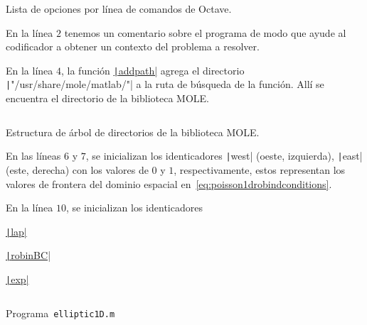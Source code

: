 \begin{problem}
\begin{listing}[ht!]
    \tiny
    \centering
    \inputminted{text}{octave-help.txt}
    \caption{Lista de opciones por línea de comandos de Octave.}
\end{listing}

En la línea $2$ tenemos un comentario sobre el programa de modo que
ayude al codificador a obtener un contexto del problema a resolver.



En la línea $4$, la función
\href{https://docs.octave.org/v9.3.0/Manipulating-the-Load-Path.html#index-addpath}{\texttt|addpath|}
agrega el directorio \texttt|"/usr/share/mole/matlab/"| a la ruta de búsqueda de la función.
Allí se encuentra el directorio de la biblioteca MOLE.

\begin{listing}[ht!]
    \tiny
    \centering
    \inputminted{text}{moledirectories.txt}
    \caption{Estructura de árbol de directorios de la biblioteca MOLE.}
\end{listing}

En las líneas $6$ y $7$, se inicializan los identicadores
\texttt|west| (oeste, izquierda),
\texttt|east| (este, derecha) con los valores de $0$ y
$1$, respectivamente, estos representan los valores de frontera del
dominio espacial en~\eqref{eq:poisson1drobindconditions}.

En la línea $10$, se inicializan los identicadores

\href{https://carlosal1015.github.io/mole_examples/api_docs/matlab/src/matlab/lap.html}{\texttt|lap|}

\href{https://carlosal1015.github.io/mole_examples/api_docs/matlab/src/matlab/robinBC.html}{\texttt|robinBC|}

\href{https://docs.octave.org/latest/Exponents-and-Logarithms.html#XREFexp}{\texttt|exp|}

\begin{listing}[ht!]
    \tiny
    \centering
    \inputminted[frame=single,framesep=10pt,linenos,firstline=1,lastline=43,highlightlines={13}]{octave}{../examples/octave/elliptic1D.m}
    \caption{Programa~\texttt{elliptic1D.m}}
    \label{code:elliptic1D.m}
\end{listing}


\end{problem}
